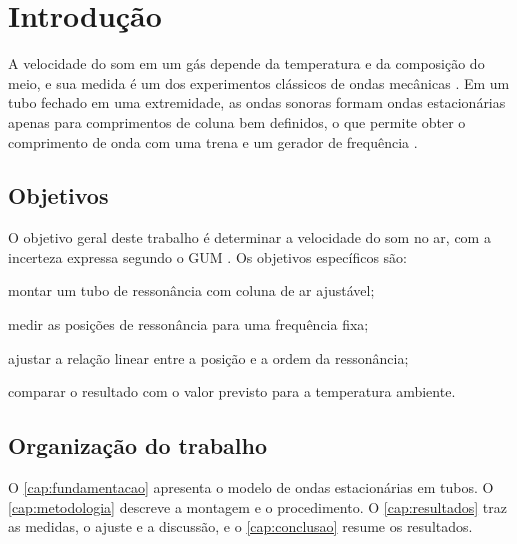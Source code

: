 \chapter{Introdução}
\label{cap:introducao}

A velocidade do som em um gás depende da temperatura e da composição do meio, e sua medida é um dos experimentos clássicos de ondas mecânicas \cite{halliday2016}. Em um tubo fechado em uma extremidade, as ondas sonoras formam ondas estacionárias apenas para comprimentos de coluna bem definidos, o que permite obter o comprimento de onda com uma trena e um gerador de frequência \cite{nussenzveig2014}.

\section{Objetivos}

O objetivo geral deste trabalho é determinar a velocidade do som no ar, com a incerteza expressa segundo o GUM \cite{jcgm2008}. Os objetivos específicos são:
\begin{alineas}
  \item montar um tubo de ressonância com coluna de ar ajustável;
  \item medir as posições de ressonância para uma frequência fixa;
  \item ajustar a relação linear entre a posição e a ordem da ressonância;
  \item comparar o resultado com o valor previsto para a temperatura ambiente.
\end{alineas}

\section{Organização do trabalho}

O \autoref{cap:fundamentacao} apresenta o modelo de ondas estacionárias em tubos. O \autoref{cap:metodologia} descreve a montagem e o procedimento. O \autoref{cap:resultados} traz as medidas, o ajuste e a discussão, e o \autoref{cap:conclusao} resume os resultados.
